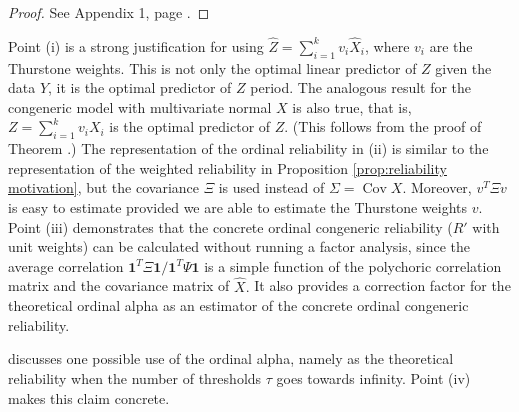 \documentclass[twoside]{article}
\DeclareMathOperator{\Cov}{Cov}
\begin{document}
\begin{proof}
See Appendix 1, page \pageref{proof:omega-prime}.
\end{proof}
Point (i) is a strong justification for using $\hat{Z}=\sum_{i=1}^{k}v_{i}\hat{X}_{i}$,
where $v_{i}$ are the Thurstone weights. This is not only the optimal
linear predictor of $Z$ given the data $Y$, it is the optimal predictor
of $Z$ period. The analogous result for the congeneric model with
multivariate normal $X$ is also true, that is, $Z=\sum_{i=1}^{k}v_{i}X_{i}$
is the optimal predictor of $Z$. (This follows from the proof of
Theorem \pageref{thm:omega-prime}.) The representation of the ordinal
reliability in (ii) is similar to the representation of the weighted
reliability in Proposition \ref{prop:reliability motivation}, but the covariance $\Xi$ is used
instead of $\Sigma = \Cov X$. Moreover, $v^{T}\Xi v$ is easy to estimate
provided we are able to estimate the Thurstone weights $v$. 
Point (iii) demonstrates that the concrete ordinal congeneric reliability ($ R'$ with unit weights) can be calculated without running a factor analysis, since the average correlation $\boldsymbol{1}^{T}\Xi\boldsymbol{1}/\boldsymbol{1}^{T}\Psi\boldsymbol{1}$ is a simple function of the polychoric correlation matrix and the covariance matrix of $\hat{X}.$ It also provides a correction factor for the theoretical ordinal alpha as an estimator of the concrete ordinal congeneric reliability.

\citet[p. 1068]{Chalmers2018-fj} discusses one possible use of the ordinal alpha, namely as the theoretical reliability when the number of thresholds $\tau$ goes towards infinity. Point (iv) makes this claim concrete.
\end{document}
